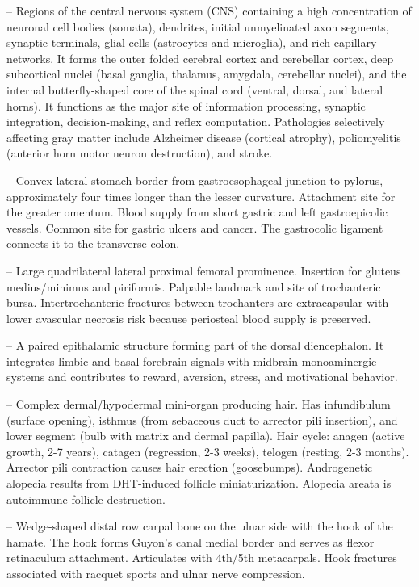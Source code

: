 -- Regions of the central nervous system (CNS) containing a high concentration of neuronal cell bodies (somata), dendrites, initial unmyelinated axon segments, synaptic terminals, glial cells (astrocytes and microglia), and rich capillary networks. It forms the outer folded cerebral cortex and cerebellar cortex, deep subcortical nuclei (basal ganglia, thalamus, amygdala, cerebellar nuclei), and the internal butterfly-shaped core of the spinal cord (ventral, dorsal, and lateral horns). It functions as the major site of information processing, synaptic integration, decision-making, and reflex computation. Pathologies selectively affecting gray matter include Alzheimer disease (cortical atrophy), poliomyelitis (anterior horn motor neuron destruction), and stroke.

-- Convex lateral stomach border from gastroesophageal junction to pylorus, approximately four times longer than the lesser curvature. Attachment site for the greater omentum. Blood supply from short gastric and left gastroepicolic vessels. Common site for gastric ulcers and cancer. The gastrocolic ligament connects it to the transverse colon.

-- Large quadrilateral lateral proximal femoral prominence. Insertion for gluteus medius/minimus and piriformis. Palpable landmark and site of trochanteric bursa. Intertrochanteric fractures between trochanters are extracapsular with lower avascular necrosis risk because periosteal blood supply is preserved.

-- A paired epithalamic structure forming part of the dorsal diencephalon. It integrates limbic and basal-forebrain signals with midbrain monoaminergic systems and contributes to reward, aversion, stress, and motivational behavior.

-- Complex dermal/hypodermal mini-organ producing hair. Has infundibulum (surface opening), isthmus (from sebaceous duct to arrector pili insertion), and lower segment (bulb with matrix and dermal papilla). Hair cycle: anagen (active growth, 2-7 years), catagen (regression, 2-3 weeks), telogen (resting, 2-3 months). Arrector pili contraction causes hair erection (goosebumps). Androgenetic alopecia results from DHT-induced follicle miniaturization. Alopecia areata is autoimmune follicle destruction.

-- Wedge-shaped distal row carpal bone on the ulnar side with the hook of the hamate. The hook forms Guyon's canal medial border and serves as flexor retinaculum attachment. Articulates with 4th/5th metacarpals. Hook fractures associated with racquet sports and ulnar nerve compression.

